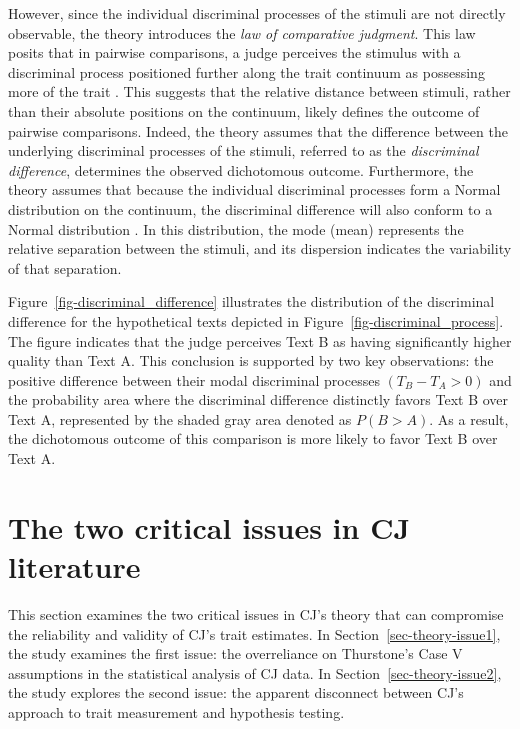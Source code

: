 \documentclass[
  authoryear,
  review,
  1p]{elsarticle}
\begin{document}
However, since the individual discriminal processes of the stimuli are
not directly observable, the theory introduces the \emph{law of
comparative judgment}. This law posits that in pairwise comparisons, a
judge perceives the stimulus with a discriminal process positioned
further along the trait continuum as possessing more of the trait
\citep[pp.~251]{Bramley_2008}. This suggests that the relative distance
between stimuli, rather than their absolute positions on the continuum,
likely defines the outcome of pairwise comparisons. Indeed, the theory
assumes that the difference between the underlying discriminal processes
of the stimuli, referred to as the \emph{discriminal difference},
determines the observed dichotomous outcome. Furthermore, the theory
assumes that because the individual discriminal processes form a Normal
distribution on the continuum, the discriminal difference will also
conform to a Normal distribution \citep{Andrich_1978}. In this
distribution, the mode (mean) represents the relative separation between
the stimuli, and its dispersion indicates the variability of that
separation.

Figure~\ref{fig-discriminal_difference} illustrates the distribution of
the discriminal difference for the hypothetical texts depicted in
Figure~\ref{fig-discriminal_process}. The figure indicates that the
judge perceives Text B as having significantly higher quality than Text
A. This conclusion is supported by two key observations: the positive
difference between their modal discriminal processes
\((T_{B} - T_{A} > 0)\) and the probability area where the discriminal
difference distinctly favors Text B over Text A, represented by the
shaded gray area denoted as \(P(B > A)\). As a result, the dichotomous
outcome of this comparison is more likely to favor Text B over Text A.

\section{The two critical issues in CJ
literature}\label{sec-theory-issues}

This section examines the two critical issues in CJ's theory that can
compromise the reliability and validity of CJ's trait estimates. In
Section~\ref{sec-theory-issue1}, the study examines the first issue: the
overreliance on Thurstone's Case V assumptions in the statistical
analysis of CJ data. In Section~\ref{sec-theory-issue2}, the study
explores the second issue: the apparent disconnect between CJ's approach
to trait measurement and hypothesis testing.
\end{document}
